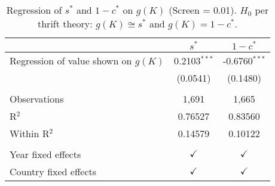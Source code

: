 \begin{table}[pos=h]
\caption{Regression of \(s^*\) and \(1-c^*\) on \(g(K)\) (Screen = 0.01). \(H_0\) per thrift theory: \(g(K) \cong s^*\) and \(g(K) = 1 - c^*\).}
\centering
\begin{tabularx}{\columnwidth}{lcc}
   \toprule
                                           & $s^*$          & $1-c^*$ \\   
   \midrule 
   Regression of value shown on \(g(K)\)   & 0.2103$^{***}$ & -0.6760$^{***}$\\   
                                           & (0.0541)       & (0.1480)\\   
    \\
   Observations                            & 1,691          & 1,665\\  
   R$^2$                                   & 0.76527        & 0.83560\\  
   Within R$^2$                            & 0.14579        & 0.10122\\  
    \\
   Year fixed effects                      & $\checkmark$   & $\checkmark$\\   
   Country fixed effects                   & $\checkmark$   & $\checkmark$\\   
   \bottomrule
\end{tabularx}
   \label{tbl-4}
\end{table}